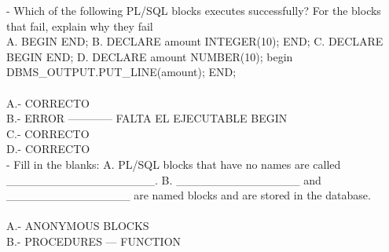 \begin{enumerate}[1.]
	- Which of the following PL/SQL blocks executes successfully? For the blocks that fail, explain why they fail
	\\
	\subitem A. BEGIN
	\subitem    END;
	\subitem B. DECLARE
 	\subitem    amount INTEGER(10);
	\subitem    END;
	\subitem C. DECLARE
	 \subitem   BEGIN
	 \subitem   END;
	\subitem D. DECLARE
	 \subitem	amount NUMBER(10);
	 \subitem	begin
	 \subitem	DBMS\_OUTPUT.PUT\_LINE(amount);
	 \subitem	END;
	\\\\A.- CORRECTO
	\\B.- ERROR ------------ FALTA EL EJECUTABLE BEGIN
	\\C.- CORRECTO
	\\D.- CORRECTO\\

	- Fill in the blanks:
	\subitem A. PL/SQL blocks that have no names are called \_\_\_\_\_\_\_\_\_\_\_\_\_\_\_\_\_\_.
	\subitem B. \_\_\_\_\_\_\_\_\_\_\_\_\_\_\_ and \_\_\_\_\_\_\_\_\_\_\_\_\_\_\_ are named blocks and are stored in the database.
	\\\\A.- ANONYMOUS BLOCKS
	\\B.- PROCEDURES --- FUNCTION

\end{enumerate}

